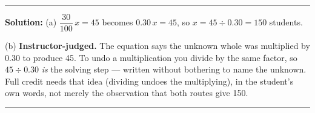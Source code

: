 \documentclass[12pt]{article}
\begin{document}
\vspace{0.25cm}\noindent\rule{\linewidth}{0.2pt}\vspace{0.25cm}


\textbf{Solution:} (a) $\dfrac{30}{100}\,x = 45$ becomes $0.30\,x = 45$, so
$x = 45 \div 0.30 = 150$ students. 

(b) \textbf{Instructor-judged.} The equation says the unknown whole was
multiplied by $0.30$ to produce 45. To undo a multiplication you divide by the
same factor, so $45 \div 0.30$ \emph{is} the solving step --- written without
bothering to name the unknown. Full credit needs that idea (dividing undoes the
multiplying), in the student's own words, not merely the observation that both
routes give 150.

\vspace{0.25cm}\noindent\rule{\linewidth}{0.2pt}\vspace{0.25cm}
\end{document}
